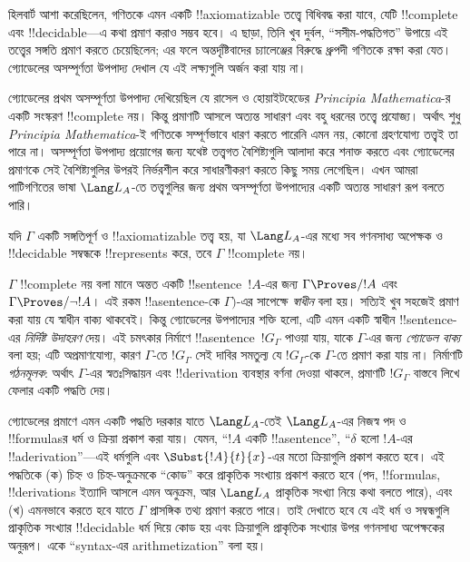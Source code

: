 \documentclass[../../../include/open-logic-section]{subfiles}
\begin{document}


হিলবার্ট আশা করেছিলেন, গণিতকে এমন একটি !!{axiomatizable} তত্ত্বে বিধিবদ্ধ করা
যাবে, যেটি !!{complete} এবং !!{decidable}—এ কথা প্রমাণ করাও সম্ভব হবে।
এ ছাড়া, তিনি খুব দুর্বল, ``সসীম-পদ্ধতিগত'' উপায়ে এই তত্ত্বের সঙ্গতি প্রমাণ
করতে চেয়েছিলেন; এর ফলে অন্তর্দৃষ্টিবাদের চ্যালেঞ্জের বিরুদ্ধে ধ্রুপদী গণিতকে
রক্ষা করা যেত। গ্যোডেলের অসম্পূর্ণতা উপপাদ্য দেখাল যে এই লক্ষ্যগুলি অর্জন করা
যায় না।

গ্যোডেলের প্রথম অসম্পূর্ণতা উপপাদ্য দেখিয়েছিল যে রাসেল ও হোয়াইটহেডের
\emph{Principia Mathematica}-র একটি সংস্করণ !!{complete} নয়। কিন্তু প্রমাণটি
আসলে অত্যন্ত সাধারণ এবং বহু ধরনের তত্ত্বে প্রযোজ্য। অর্থাৎ শুধু
\emph{Principia Mathematica}-ই গণিতকে সম্পূর্ণভাবে ধারণ করতে পারেনি এমন নয়,
কোনো গ্রহণযোগ্য তত্ত্বই তা পারে না। অসম্পূর্ণতা উপপাদ্য প্রয়োগের জন্য যথেষ্ট
তত্ত্বগত বৈশিষ্ট্যগুলি আলাদা করে শনাক্ত করতে এবং গ্যোডেলের প্রমাণকে সেই
বৈশিষ্ট্যগুলির উপরই নির্ভরশীল করে সাধারণীকরণ করতে কিছু সময় লেগেছিল। এখন আমরা
পাটিগণিতের ভাষা $\Lang L_A$-তে তত্ত্বগুলির জন্য প্রথম অসম্পূর্ণতা উপপাদ্যের
একটি অত্যন্ত সাধারণ রূপ বলতে পারি।

\begin{thm}
যদি $\Gamma$ একটি সঙ্গতিপূর্ণ ও !!{axiomatizable} তত্ত্ব হয়, যা
$\Lang L_A$-এর মধ্যে সব গণনসাধ্য অপেক্ষক ও !!{decidable} সম্বন্ধকে
!!{represents} করে, তবে $\Gamma$ !!{complete} নয়।
\end{thm}

$\Gamma$ !!{complete} নয় বলা মানে অন্তত একটি !!{sentence}~$!A$-এর জন্য
$\Gamma \Proves/ !A$ এবং $\Gamma \Proves/ \lnot !A$। এই রকম
!!a{sentence}-কে $\Gamma)$-এর সাপেক্ষে \emph{স্বাধীন} বলা হয়। সত্যিই খুব
সহজেই প্রমাণ করা যায় যে স্বাধীন বাক্য থাকবেই। কিন্তু গ্যোডেলের
উপপাদ্যের শক্তি হলো, এটি এমন একটি স্বাধীন !!{sentence}-এর \emph{নির্দিষ্ট
উদাহরণ} দেয়। এই চমৎকার নির্মাণে !!a{sentence}~$!G_\Gamma$ পাওয়া যায়,
যাকে $\Gamma$-এর জন্য \emph{গ্যোডেল বাক্য} বলা হয়; এটি অপ্রমাণযোগ্য, কারণ
$\Gamma$-তে $!G_\Gamma$ সেই দাবির সমতুল্য যে $!G_\Gamma$-কে $\Gamma$-তে
প্রমাণ করা যায় না। নির্মাণটি \emph{গঠনমূলক}: অর্থাৎ $\Gamma$-এর
স্বতঃসিদ্ধায়ন এবং !!{derivation} ব্যবস্থার বর্ণনা দেওয়া থাকলে, প্রমাণটি
$!G_\Gamma$ বাস্তবে লিখে ফেলার একটি পদ্ধতি দেয়।

গ্যোডেলের প্রমাণে এমন একটি পদ্ধতি দরকার যাতে $\Lang L_A$-তেই $\Lang L_A$-এর
নিজস্ব পদ ও !!{formula}sর ধর্ম ও ক্রিয়া প্রকাশ করা যায়। যেমন,
``$!A$ একটি !!a{sentence}'', ``$\delta$ হলো $!A$-এর !!a{derivation}''—এই
ধর্মগুলি এবং $\Subst{!A}{t}{x}$-এর মতো ক্রিয়াগুলি প্রকাশ করতে হবে। এই
পদ্ধতিকে (ক) চিহ্ন ও চিহ্ন-অনুক্রমকে ``কোড'' করে প্রাকৃতিক সংখ্যায় প্রকাশ
করতে হবে (পদ, !!{formula}s, !!{derivation}s ইত্যাদি আসলে এমন অনুক্রম, আর
$\Lang L_A$ প্রাকৃতিক সংখ্যা নিয়ে কথা বলতে পারে), এবং (খ) এমনভাবে করতে হবে
যাতে $\Gamma$ প্রাসঙ্গিক তথ্য প্রমাণ করতে পারে। তাই দেখাতে হবে যে এই ধর্ম ও
সম্বন্ধগুলি প্রাকৃতিক সংখ্যার !!{decidable} ধর্ম দিয়ে কোড হয় এবং ক্রিয়াগুলি
প্রাকৃতিক সংখ্যার উপর গণনসাধ্য অপেক্ষকের অনুরূপ। একে ``syntax-এর
arithmetization'' বলা হয়।
\end{document}
